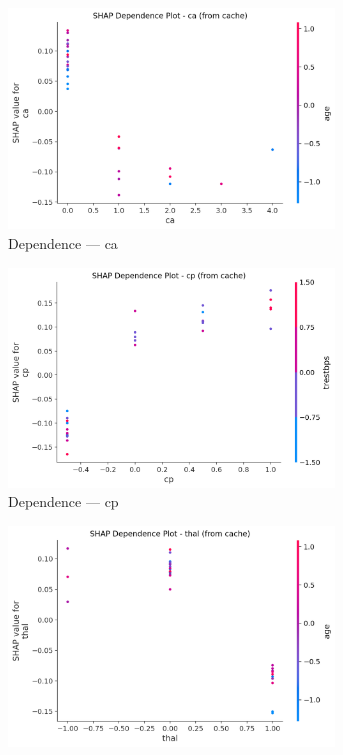 \begin{figure}[H]
\centering
\begin{subfigure}[b]{0.31\textwidth}
\centering
\includegraphics[width=0.95\textwidth]{Result/heart_dataset/RF/SHAP/Dependence CA.png}
\caption{Dependence — ca}
\label{fig:rf_heart_dep_ca}
\end{subfigure}\hfill
\begin{subfigure}[b]{0.31\textwidth}
\centering
\includegraphics[width=0.95\textwidth]{Result/heart_dataset/RF/SHAP/Dependence CP.png}
\caption{Dependence — cp}
\label{fig:rf_heart_dep_cp}
\end{subfigure}\hfill
\begin{subfigure}[b]{0.31\textwidth}
\centering
\includegraphics[width=0.95\textwidth]{Result/heart_dataset/RF/SHAP/Dependence thal.png}

\end{subfigure}
\end{figure}
